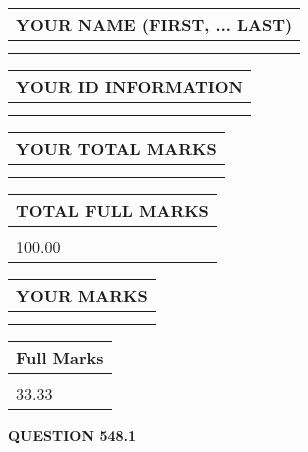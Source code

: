 \documentclass{ctexart}
\begin{document}
   
   
   
\newpage 
\setcounter{page}{ 
   548001 } 
   
   
   
   
\noindent\begin{tabular}{|l|}
\hline
YOUR NAME (FIRST, ... LAST)  \\
\hline
 \\ 
 \\ 
\hline
\end{tabular}
\hspace{0.05in} \begin{tabular}{|l|}
\hline
 YOUR   ID   INFORMATION  \\
\hline
 \\ 
 \\ 
\hline
\end{tabular}
   
   
\vspace{0.2in}\noindent\begin{tabular}{|l|}
\hline
YOUR TOTAL MARKS  \\
\hline
 \\ 
 \\ 
\hline
\end{tabular}
\hspace{0.05in} \begin{tabular}{|l|}
\hline
TOTAL FULL MARKS  \\
\hline
 \\ 
100.00 \\
\hline
\end{tabular}
   
   
 \vspace{0.2in}
 
 
 
 
   
   
  
\vspace{0.2in}
  
\noindent\begin{tabular}{|l|}
\hline
 YOUR MARKS  \\
\hline
 \\ 
 \\ 
\hline
\end{tabular}
\hspace{0.05in} \begin{tabular}{|l|}
\hline
 Full Marks  \\
\hline
 \\ 
33.33 \\
\hline
\end{tabular}
{\textbf{\Large{QUESTION
548.1 
}}}
  
\end{document}
